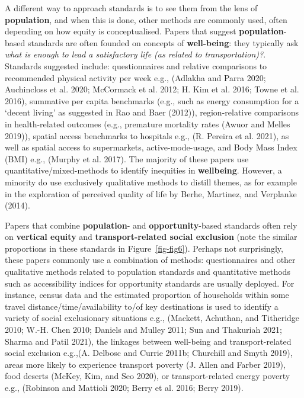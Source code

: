 \documentclass[12pt, oneside]{report}
\begin{document}
A different way to approach standards is to see them from the lens of
\textbf{population}, and when this is done, other methods are commonly
used, often depending on how equity is conceptualised. Papers that
suggest \textbf{population}-based standards are often founded on
concepts of \textbf{well-being}: they typically ask \emph{what is enough
to lead a satisfactory life (as related to transportation)?}. Standards
suggested include: questionnaires and relative comparisons to
recommended physical activity per week e.g., (Adlakha and Parra 2020;
Auchincloss et al. 2020; McCormack et al. 2012; H. Kim et al. 2016;
Towne et al. 2016), summative per capita benchmarks (e.g., such as
energy consumption for a `decent living' as suggested in Rao and Baer
(2012)), region-relative comparisons in health-related outcomes (e.g.,
premature mortality rates (Awuor and Melles 2019)), spatial access
benchmarks to hospitals e.g., (R. Pereira et al. 2021), as well as
spatial access to supermarkets, active-mode-usage, and Body Mass Index
(BMI) e.g., (Murphy et al. 2017). The majority of these papers use
quantitative/mixed-methods to identify inequities in \textbf{wellbeing}.
However, a minority do use exclusively qualitative methods to distill
themes, as for example in the exploration of perceived quality of life
by Berhe, Martinez, and Verplanke (2014).

Papers that combine \textbf{population}- and \textbf{opportunity}-based
standards often rely on \textbf{vertical equity} and
\textbf{transport-related social exclusion} (note the similar
proportions in these standards in Figure~\ref{fig-fig6}). Perhaps not
surprisingly, these papers commonly use a combination of methods:
questionnaires and other qualitative methods related to population
standards and quantitative methods such as accessibility indices for
opportunity standards are usually deployed. For instance, census data
and the estimated proportion of households within some travel
distance/time/availability to/of key destinations is used to identify a
variety of social exclusionary situations e.g., (Mackett, Achuthan, and
Titheridge 2010; W.-H. Chen 2010; Daniels and Mulley 2011; Sun and
Thakuriah 2021; Sharma and Patil 2021), the linkages between well-being
and transport-related social exclusion e.g.,(A. Delbosc and Currie
2011b; Churchill and Smyth 2019), areas more likely to experience
transport poverty (J. Allen and Farber 2019), food deserts (McKey, Kim,
and Seo 2020), or transport-related energy poverty e.g., (Robinson and
Mattioli 2020; Berry et al. 2016; Berry 2019).
\end{document}
